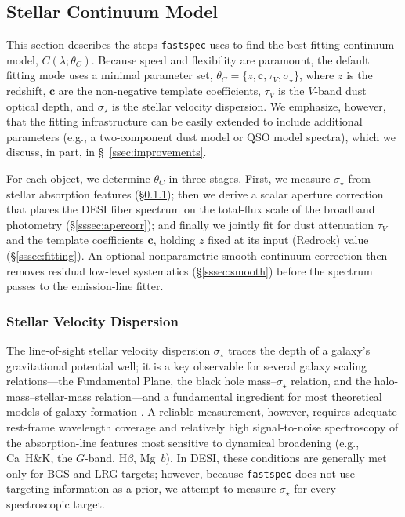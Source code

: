 \documentclass[modern,linenumbers]{aastex701}
\newcommand{\fastspec}{\texttt{fastspec}}
\newcommand{\vdisp}{\ensuremath{\sigma_\star}}
\newcommand{\tauv}{\ensuremath{\tau_V}}
\begin{document}
\subsection{Stellar Continuum Model}
\label{ssec:continuum}

This section describes the steps \fastspec{} uses to find the
best-fitting continuum model, $C(\lambda;\theta_C)$. Because speed and
flexibility are paramount, the default fitting mode uses a minimal
parameter set, $\theta_C = \{z,\mathbf{c},\tauv,\vdisp\}$, where $z$
is the redshift, $\mathbf{c}$ are the non-negative template
coefficients, $\tauv$ is the $V$-band dust optical depth, and $\vdisp$
is the stellar velocity dispersion. We emphasize, however, that the
fitting infrastructure can be easily extended to include additional
parameters (e.g., a two-component dust model or QSO model spectra),
which we discuss, in part, in \S~\ref{ssec:improvements}.

For each object, we determine $\theta_C$ in three stages. First, we
measure $\vdisp$ from stellar absorption features
(\S\ref{sssec:vdisp}); then we derive a scalar aperture correction
that places the DESI fiber spectrum on the total-flux scale of the
broadband photometry (\S\ref{sssec:apercorr}); and finally we jointly
fit for dust attenuation $\tauv$ and the template coefficients
$\mathbf{c}$, holding $z$ fixed at its input (Redrock) value
(\S\ref{sssec:fitting}). An optional nonparametric smooth-continuum
correction then removes residual low-level systematics
(\S\ref{sssec:smooth}) before the spectrum passes to the emission-line
fitter.

\subsubsection{Stellar Velocity Dispersion}
\label{sssec:vdisp}

The line-of-sight stellar velocity dispersion \vdisp{} traces the
depth of a galaxy's gravitational potential well; it is a key
observable for several galaxy scaling relations---the Fundamental
Plane, the black hole mass--\vdisp{} relation, and the
halo-mass--stellar-mass relation---and a fundamental ingredient for
most theoretical models of galaxy formation \citep[and references
  therein]{renzini06a, blanton09a, kormendy13a, vegetti24a}. A
reliable measurement, however, requires adequate rest-frame wavelength
coverage and relatively high signal-to-noise spectroscopy of the
absorption-line features most sensitive to dynamical broadening (e.g.,
Ca~H\&K, the $G$-band, H$\beta$, Mg~$b$). In DESI, these conditions
are generally met only for BGS and LRG targets; however, because
\fastspec{} does not use targeting information as a prior, we attempt
to measure \vdisp{} for every spectroscopic target.
\end{document}
